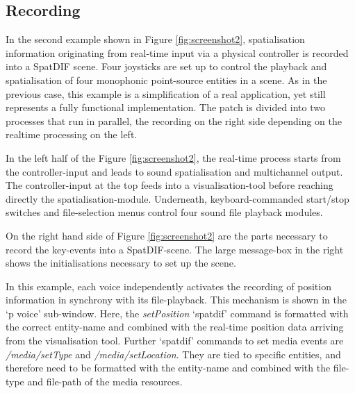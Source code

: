 \documentclass{article}
\begin{document}
\subsection{Recording}\label{subsec:recording}

In the second example shown in Figure \ref{fig:screenshot2}, spatialisation information originating from real-time input via a physical controller is recorded into a SpatDIF scene.
Four joysticks are set up to control the playback and spatialisation of four monophonic point-source entities in a scene.
As in the previous case, this example is a simplification of a real application, yet still represents a fully functional implementation.
The patch is divided into two processes that run in parallel, the recording on the right side depending on the
realtime processing on the left.
 
In the left half of the Figure \ref{fig:screenshot2}, the real-time process starts from the controller-input and leads to sound spatialisation and multichannel output.
The controller-input at the top feeds into a visualisation-tool before reaching directly the spatialisation-module.
Underneath, keyboard-commanded start/stop switches and file-selection menus control four sound file playback modules.

On the right hand side of Figure \ref{fig:screenshot2} are the parts necessary to record the key-events into a SpatDIF-scene.
The large message-box in the right shows the initialisations necessary to set up the scene.

In this example, each voice independently activates the recording of position information in synchrony with its file-playback.
This mechanism is shown in the `p voice' sub-window. 
Here, the \emph{setPosition} `spatdif' command is formatted with the correct entity-name and combined with the real-time position data arriving from the visualisation tool.
Further `spatdif' commands to set media events are \emph{/media/setType} and \emph{/media/setLocation}.
They are tied to specific entities, and therefore need to be formatted with the entity-name and combined with the file-type and file-path of the media resources.
\end{document}
